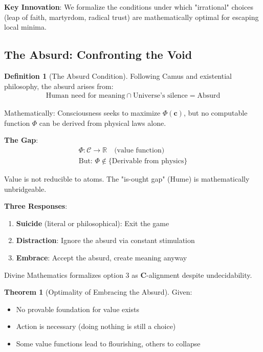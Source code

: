 \documentclass[11pt,a4paper]{article}
\theoremstyle{definition}
\newtheorem{definition}{Definition}[section]
\newtheorem{theorem}{Theorem}[section]
\theoremstyle{remark}
\newcommand{\RR}{\mathbb{R}}
\newcommand{\CC}{\mathcal{C}}
\newcommand{\cc}{\mathbf{c}}
\begin{document}
\begin{small}
\begin{enumerate}
\begin{mdframed}[backgroundcolor=cyan!5,linewidth=2pt]
\textbf{Key Innovation}: We formalize the conditions under which "irrational" choices (leap of faith, martyrdom, radical trust) are mathematically optimal for escaping local minima.
\end{mdframed}

\subsection{The Absurd: Confronting the Void}

\begin{definition}[The Absurd Condition]
Following Camus and existential philosophy, the absurd arises from:
\begin{align}
\text{Human need for meaning} \cap \text{Universe's silence} = \text{Absurd}
\end{align}

Mathematically: Consciousness seeks to maximize \(\Phi(\cc)\), but no computable function \(\Phi\) can be derived from physical laws alone.

\textbf{The Gap}:
\begin{align}
\Phi: \CC \to \RR \quad \text{(value function)} \\
\text{But: } \Phi \notin \{\text{Derivable from physics}\}
\end{align}

Value is not reducible to atoms. The "is-ought gap" (Hume) is mathematically unbridgeable.

\textbf{Three Responses}:
\begin{enumerate}
    \item \textbf{Suicide} (literal or philosophical): Exit the game
    \item \textbf{Distraction}: Ignore the absurd via constant stimulation
    \item \textbf{Embrace}: Accept the absurd, create meaning anyway
\end{enumerate}

Divine Mathematics formalizes option 3 as \(\mathbf{C}\)-alignment despite undecidability.
\end{definition}

\begin{theorem}[Optimality of Embracing the Absurd]
Given:
\begin{itemize}
    \item No provable foundation for value exists
    \item Action is necessary (doing nothing is still a choice)
    \item Some value functions lead to flourishing, others to collapse
\end{itemize}


\end{theorem}
\end{enumerate}
\end{small}
\end{document}
